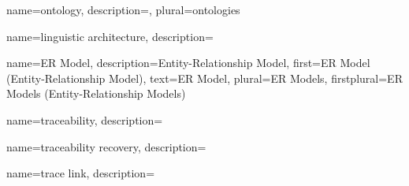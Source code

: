 {
    name={ontology},
    description={},
    plural={ontologies}
}


{
    name={linguistic architecture},
    description={}
}

{
    name={ER Model},
    description={Entity-Relationship Model},
    first={ER Model (Entity-Relationship Model)},
    text={ER Model},
    plural={ER Models},
    firstplural={ER Models (Entity-Relationship Models)}
}

{
    name={traceability},
    description={}
}

{
    name={traceability recovery},
    description={}
}

{
    name={trace link},
    description={}
}